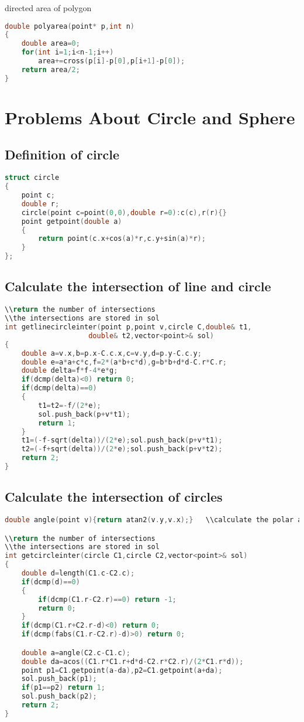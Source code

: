 directed area of polygon
  \begin{lstlisting}[language=C++]
double polyarea(point* p,int n)  
{  
    double area=0;  
    for(int i=1;i<n-1;i++)  
        area+=cross(p[i]-p[0],p[i+1]-p[0]);  
    return area/2;  
}  
  \end{lstlisting}

  \section{Problems About Circle and Sphere}
   \subsection{Definition of circle}
   \begin{lstlisting}[language=C++]
struct circle
{
	point c;
	double r;
	circle(point c=point(0,0),double r=0):c(c),r(r){}
	point getpoint(double a)
	{
		return point(c.x+cos(a)*r,c.y+sin(a)*r);
	}
};
   \end{lstlisting}
   \subsection{Calculate the intersection of line and circle}
   \begin{lstlisting}[language=C++]
\\return the number of intersections
\\the intersections are stored in sol
int getlinecircleinter(point p,point v,circle C,double& t1,
					double& t2,vector<point>& sol)
{
	double a=v.x,b=p.x-C.c.x,c=v.y,d=p.y-C.c.y;
	double e=a*a+c*c,f=2*(a*b+c*d),g=b*b+d*d-C.r*C.r;
	double delta=f*f-4*e*g;
	if(dcmp(delta)<0) return 0;
	if(dcmp(delta)==0)
	{
		t1=t2=-f/(2*e);
		sol.push_back(p+v*t1);
		return 1;
	}
	t1=(-f-sqrt(delta))/(2*e);sol.push_back(p+v*t1);
	t2=(-f+sqrt(delta))/(2*e);sol.push_back(p+v*t2);
	return 2;
}
   \end{lstlisting}
   \subsection{Calculate the intersection of circles}
   \begin{lstlisting}[language=C++]
double angle(point v){return atan2(v.y,v.x);}   \\calculate the polar angle

\\return the number of intersections
\\the intersections are stored in sol
int getcircleinter(circle C1,circle C2,vector<point>& sol)
{
	double d=length(C1.c-C2.c);
	if(dcmp(d)==0)
	{
		if(dcmp(C1.r-C2.r)==0) return -1;
		return 0;
	}
	if(dcmp(C1.r+C2.r-d)<0) return 0;
	if(dcmp(fabs(C1.r-C2.r)-d)>0) return 0;

	double a=angle(C2.c-C1.c);
	double da=acos((C1.r*C1.r+d*d-C2.r*C2.r)/(2*C1.r*d));
	point p1=C1.getpoint(a-da),p2=C1.getpoint(a+da);
	sol.push_back(p1);
	if(p1==p2) return 1;
	sol.push_back(p2);
	return 2;
}
   \end{lstlisting}

